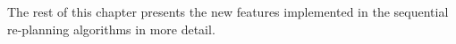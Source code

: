 The rest of this chapter presents the new features implemented in the sequential re-planning algorithms in more detail.
 
%
%
 
